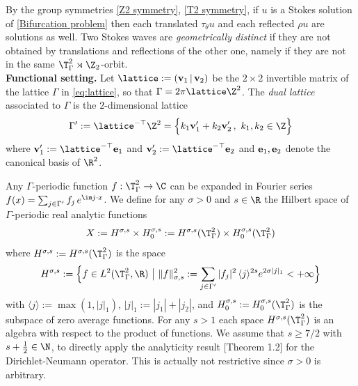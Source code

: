 \documentclass[11pt,a4paper,reqno]{article}
\numberwithin{equation}{section}
\theoremstyle{definition}
\begin{document}
By the group symmetries  \eqref{Z2 symmetry}, 
\eqref{T2 symmetry}, 
if $ u $ is a Stokes solution of
\eqref{Bifurcation problem} then each  translated  
$ \tau_\theta u $ and each reflected 
$ \rho u $ are solutions as well.  
Two Stokes waves   
are {\it geometrically  distinct}  if they are not obtained 
by translations and reflections of the other one, namely if they are not in the same $ \T^2_\Gamma \rtimes \Z_2 $-orbit.\\[1mm]
    \noindent
    {\bf Functional setting.}
    Let $  \lattice := ({\bf v}_1 \, | \,  {\bf v}_2 )$  be the 
    $ 2 \times 2 $ invertible matrix of 
    the lattice $\Gamma$ in \eqref{eq:lattice}, so that  $\Gamma=2\pi  \lattice\Z^2$. 
    The {\it dual lattice} associated to $ \Gamma $ is the $ 2 $-dimensional lattice 
    \begin{equation}\label{eq:Gamma'}
    \Gamma':=  \lattice^{-\top}\Z^2 =
\Big\{ k_1  {\bf v}_1' +  
k_2  {\bf v}_2' 
\, , \ k_1, k_2 \in 
\Z \Big\} 
    \end{equation}
where $ {\bf v}_1' :=  \lattice^{-\top} 
{\bf e}_1$ and 
$ {\bf v}_2' :=  \lattice^{-\top}
{\bf e}_2 $ 
and
$ {\bf e}_1, {\bf e}_2 $ denote the canonical 
basis of $ \R^2 $. 

    
    Any $\Gamma$-periodic function $f:\T^2_\Gamma\to \C$ can be expanded in Fourier series $ 
        f(x)=\sum_{j \in \Gamma'} f_j \,  e^{\im j \cdot x}  $. We    define for any $ \sigma > 0 $ and 
$ s \in \R $ 
the Hilbert space  of $ \Gamma $-periodic 
real analytic functions
\begin{equation}\label{spaceX}
X := H^{\sigma,s} \times H^{\sigma,s}_0  := 
H^{\sigma,s}(\T^2_\Gamma) \times H^{\sigma,s}_0(\T^2_\Gamma)   
\end{equation}
where  $ H^{\sigma,s} := H^{\sigma,s}(\T^2_\Gamma)$ is the space 
\begin{equation}\label{def:Hs}
        H^{\sigma,s} := \Big\{f\in L^2(\T^2_\Gamma,\R) \  \big| \ 
        \|f\|_{\sigma,s}^2 := \sum_{j\in \Gamma'} |  f_j|^2 \, \langle j\rangle^{2 s}e^{2\sigma |j|_1} <+\infty\Big\}
    \end{equation}
with    $ \langle j \rangle := \max(1, |j|_1) $, $|j|_1 :=|j_1|+|j_2|$, and  
$ H^{\sigma,s}_0 := H^{\sigma,s}_0(\T^2_\Gamma)
$ is the subspace of zero average functions.
For any $ s > 1 $ 
each space $ H^{\sigma,s}(\T^2_\Gamma) $ 
is an algebra with respect to the product of functions. 
We assume that 
$ s \geq 7 / 2 $ with $ s + \tfrac12 \in \N $, to directly apply  the analyticity result  
\cite{BMV2}[Theorem 1.2] 
for the Dirichlet-Neumann operator.
This  is 
actually  
not restrictive since $ \sigma > 0 $ is arbitrary.
\end{document}
